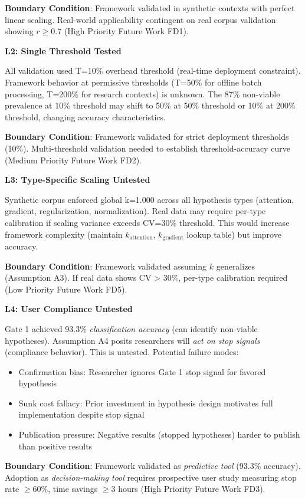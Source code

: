\textbf{Boundary Condition}: Framework validated in synthetic contexts with perfect linear scaling. Real-world applicability contingent on real corpus validation showing $r \geq 0.7$ (High Priority Future Work FD1).

\textbf{L2: Single Threshold Tested}

All validation used T=10\% overhead threshold (real-time deployment constraint). Framework behavior at permissive thresholds (T=50\% for offline batch processing, T=200\% for research contexts) is unknown. The 87\% non-viable prevalence at 10\% threshold may shift to 50\% at 50\% threshold or 10\% at 200\% threshold, changing accuracy characteristics.

\textbf{Boundary Condition}: Framework validated for strict deployment thresholds (10\%). Multi-threshold validation needed to establish threshold-accuracy curve (Medium Priority Future Work FD2).

\textbf{L3: Type-Specific Scaling Untested}

Synthetic corpus enforced global k=1.000 across all hypothesis types (attention, gradient, regularization, normalization). Real data may require per-type calibration if scaling variance exceeds CV=30\% threshold. This would increase framework complexity (maintain $k_{\text{attention}}$, $k_{\text{gradient}}$ lookup table) but improve accuracy.

\textbf{Boundary Condition}: Framework validated assuming $k$ generalizes (Assumption A3). If real data shows CV > 30\%, per-type calibration required (Low Priority Future Work FD5).

\textbf{L4: User Compliance Untested}

Gate 1 achieved 93.3\% \textit{classification accuracy} (can identify non-viable hypotheses). Assumption A4 posits researchers will \textit{act on stop signals} (compliance behavior). This is untested. Potential failure modes:

\begin{itemize}
\item Confirmation bias: Researcher ignores Gate 1 stop signal for favored hypothesis
\item Sunk cost fallacy: Prior investment in hypothesis design motivates full implementation despite stop signal
\item Publication pressure: Negative results (stopped hypotheses) harder to publish than positive results
\end{itemize}

\textbf{Boundary Condition}: Framework validated as \textit{predictive tool} (93.3\% accuracy). Adoption as \textit{decision-making tool} requires prospective user study measuring stop rate $\geq$60\%, time savings $\geq$3 hours (High Priority Future Work FD3).

